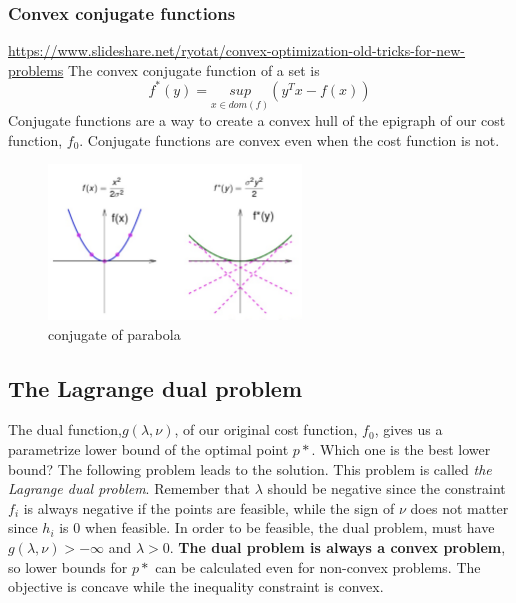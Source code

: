 \subsubsection{Convex conjugate functions}
\url{https://www.slideshare.net/ryotat/convex-optimization-old-tricks-for-new-problems}
The convex conjugate function of a set is
$$f^*(y) = \underset{x \in dom(f)}{sup}(y^Tx -f(x))$$
Conjugate functions are a way to create a convex hull of the epigraph of our cost function, $f_0$. Conjugate functions are convex even when the cost function is not. 

\begin{figure}
\centering
\includegraphics[width=0.6\textwidth]{images/conjugate.png}
\caption{\label{fig:frog}conjugate of parabola}
\end{figure}

\subsection{The Lagrange dual problem}
The dual function,$g(\lambda,\nu)$, of our original cost function, $f_0$, gives us a parametrize lower bound of the optimal point $p*$. 
Which one is the best lower bound? The following problem leads to the solution.
This problem is called \textit{the Lagrange dual problem}. Remember that $\lambda$ should be negative since the constraint $f_i$ is always negative if the points are feasible, while the sign of $\nu$ does not matter since $h_i$ is 0 when feasible. In order to be feasible, the dual problem, must have $g(\lambda,\nu)>-\infty$ and $\lambda>0$. 
\textbf{The dual problem is always a convex problem}, so lower bounds for $p*$ can be calculated even for non-convex problems. The objective is concave while the inequality constraint is convex.

